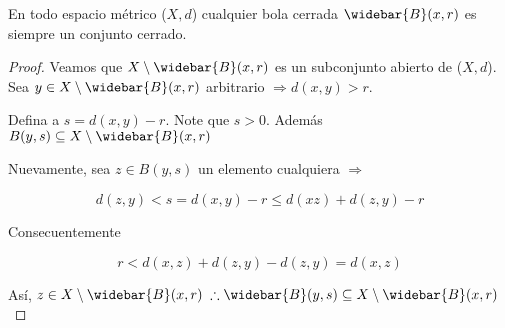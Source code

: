 \begin{theorem} \label{theom226}
    En todo espacio métrico ($X,d$) cualquier bola cerrada $\widebar{B}(x,r)$ es siempre un conjunto cerrado.
\end{theorem}

\begin{proof}
    Veamos que $X \setminus \widebar{B}(x,r)$ es un subconjunto abierto de ($X,d$). Sea $y \in X \setminus \widebar{B}(x,r)$ arbitrario $\Rightarrow d(x,y) >r$.

    Defina a $s = d(x,y) - r$. Note que $s>0$. Además $B(y,s) \subseteq X \setminus \widebar{B}(x,r)$

    Nuevamente, sea $z \in B(y,s)$ un elemento cualquiera $\Rightarrow$

    \begin{equation*}
        d(z,y) < s = d(x,y)-r \leqslant d(xz) + d(z,y) - r
    \end{equation*}

    Consecuentemente 

    \begin{equation*}
        r < d(x,z) + d(z,y) - d(z,y) = d(x,z)
    \end{equation*}

    Así, $z \in X \setminus \widebar{B}(x,r)$  $\therefore \widebar{B}(y,s) \subseteq X \setminus \widebar{B}(x,r)$
\end{proof}

